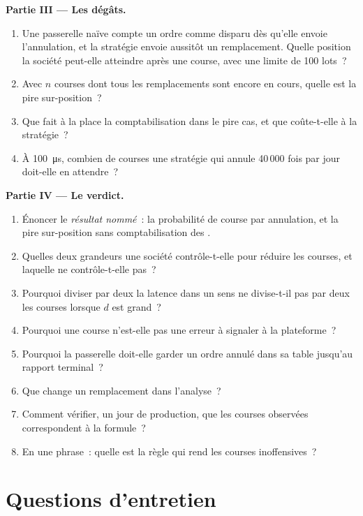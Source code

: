 \begin{problem}
\medskip\noindent\textbf{Partie III --- Les dégâts.}
\begin{enumerate}[resume]
\item Une passerelle naïve compte un ordre comme disparu dès qu'elle envoie l'annulation, et la stratégie envoie aussitôt un remplacement. Quelle
position la société peut-elle atteindre après une course, avec une limite de 100 lots~?
\item Avec $n$ courses dont tous les remplacements sont encore en cours, quelle est la pire sur-position~?
\item Que fait à la place la comptabilisation dans le pire cas, et que coûte-t-elle à la stratégie~?
\item À \qty{100}{\micro\second}, combien de courses une stratégie qui annule 40\,000 fois par jour doit-elle en attendre~?
\end{enumerate}

\medskip\noindent\textbf{Partie IV --- Le verdict.}
\begin{enumerate}[resume]
\item Énoncer le \emph{résultat nommé}~: la probabilité de course par annulation, et la pire sur-position sans
comptabilisation des .
\item Quelles deux grandeurs une société contrôle-t-elle pour réduire les courses, et laquelle ne contrôle-t-elle pas~?
\item Pourquoi diviser par deux la latence dans un sens ne divise-t-il pas par deux les courses lorsque $d$ est grand~?
\item Pourquoi une course n'est-elle pas une erreur à signaler à la plateforme~?
\item Pourquoi la passerelle doit-elle garder un ordre annulé dans sa table jusqu'au rapport terminal~?
\item Que change un remplacement dans l'analyse~?
\item Comment vérifier, un jour de production, que les courses observées correspondent à la formule~?
\item En une phrase~: quelle est la règle qui rend les courses inoffensives~?
\end{enumerate}
\end{problem}

\section{Questions d'entretien}

